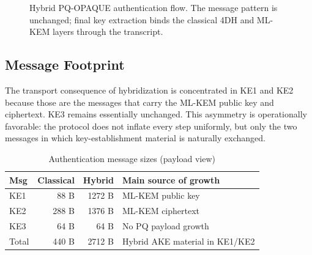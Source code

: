 \documentclass[conference]{IEEEtran}
\newcommand{\Label}[1]{L_{\mathrm{#1}}}
\begin{document}
\begin{figure}[t]
\centering
{}
\caption{Hybrid PQ-OPAQUE authentication flow. The message pattern is unchanged; final key extraction binds the classical 4DH and ML-KEM layers through the transcript.}
\label{fig:acit-flow}
\end{figure}

\subsection{Message Footprint}

The transport consequence of hybridization is concentrated in KE1 and KE2 because those are the messages that carry the ML-KEM public key and ciphertext. KE3 remains essentially unchanged. This asymmetry is operationally favorable: the protocol does not inflate every step uniformly, but only the two messages in which key-establishment material is naturally exchanged.

\begin{table}[t]
\caption{Authentication message sizes (payload view)}
\label{tab:acit-wire}
\centering
\footnotesize
\begin{tabularx}{\columnwidth}{@{}L{1.0cm}r r Y@{}}
\toprule
Msg & Classical & Hybrid & Main source of growth \\
\midrule
KE1 & 88 B & 1272 B & ML-KEM public key \\
KE2 & 288 B & 1376 B & ML-KEM ciphertext \\
KE3 & 64 B & 64 B & No PQ payload growth \\
\midrule
Total & 440 B & 2712 B & Hybrid AKE material in KE1/KE2 \\
\bottomrule
\end{tabularx}
\end{table}
\end{document}
